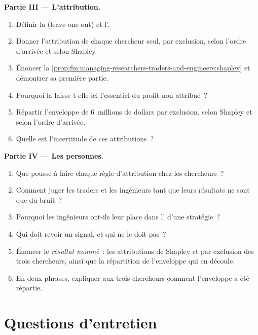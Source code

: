 \begin{problem}
\medskip\noindent\textbf{Partie III --- L'attribution.}
\begin{enumerate}[resume]
\item Définir la  (leave-one-out) et l'.
\item Donner l'attribution de chaque chercheur seul, par exclusion, selon l'ordre d'arrivée et selon Shapley.
\item Énoncer la \cref{prop:fm:managing-researchers-traders-and-engineers:shapley} et démontrer sa première partie.
\item Pourquoi la  laisse-t-elle ici l'essentiel du profit non attribué~?
\item Répartir l'enveloppe de 6~millions de dollars par exclusion, selon Shapley et selon l'ordre d'arrivée.
\item Quelle est l'incertitude de ces attributions~?
\end{enumerate}

\medskip\noindent\textbf{Partie IV --- Les personnes.}
\begin{enumerate}[resume]
\item Que pousse à faire chaque règle d'attribution chez les chercheurs~?
\item Comment juger les traders et les ingénieurs tant que leurs résultats ne sont que du bruit~?
\item Pourquoi les ingénieurs ont-ils leur place dans l' d'une stratégie~?
\item Qui doit revoir un signal, et qui ne le doit pas~?
\item Énoncer le \emph{résultat nommé}~: les attributions de Shapley et par exclusion des trois chercheurs, ainsi que la répartition de l'enveloppe qui en découle.
\item En deux phrases, expliquer aux trois chercheurs comment l'enveloppe a été répartie.
\end{enumerate}
\end{problem}

\section{Questions d'entretien}

